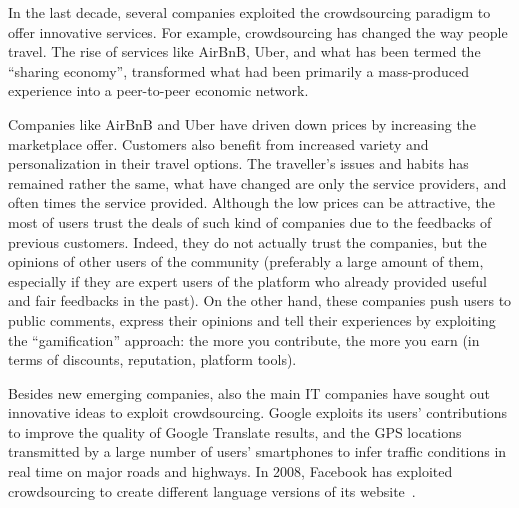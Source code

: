 In the last decade, several companies exploited the crowdsourcing paradigm to offer innovative services. For example, crowdsourcing has changed the way people travel. The rise of services like AirBnB, Uber, and what has been termed the ``sharing economy'', transformed what had been primarily a mass-produced experience into a peer-to-peer economic network.

Companies like AirBnB and Uber have driven down prices by increasing the marketplace offer. Customers also benefit from increased variety and personalization in their travel options. 
The traveller’s issues and habits has remained rather the same, what have changed are only the service providers, and often times the service provided. %
Although the low prices can be attractive, the most of users trust the deals of such kind of companies due to the feedbacks of previous customers. Indeed, they do not actually trust the companies, but the opinions of other users of the community (preferably a large amount of them, especially if they are expert users of the platform who already provided useful and fair feedbacks in the past). On the other hand, these companies push users to public comments, express their opinions and tell their experiences by exploiting the ``gamification'' approach: the more you contribute, the more you earn (in terms of discounts, reputation, platform tools). 

Besides new emerging companies, also the main IT companies have sought out innovative ideas to exploit crowdsourcing. Google exploits its users' contributions to improve the quality of Google Translate results, and the GPS locations transmitted by a large number of users' smartphones to infer traffic conditions in real time on major roads and highways. 
In 2008, Facebook has exploited crowdsourcing to create different language versions of its website~\cite{dolmaya2011ethics}. %

